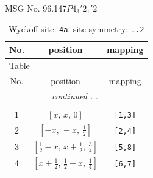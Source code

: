 \documentclass[fleqn,8pt]{jsarticle}
\begin{document}
\setcounter{MaxMatrixCols}{32}

\renewcommand{\tablename}{Table~}
\renewcommand{\figurename}{Figure~}
\begin{center}
\LARGE
MSG No. 96.147\quad$P4_{3}'2_{1}'2$
\end{center}
\renewcommand{\arraystretch}{1.2}
\begin{longtable}{ccc}
\caption{Wyckoff site: {\tt 4a}, site symmetry: {\tt ..2}}
 \\
 \hline \hline
No. & position & mapping \\ \hline \endfirsthead

\multicolumn{2}{l}{\tablename\ \thetable{}} \\
 \hline \hline
No. & position & mapping \\ \hline \endhead

 \hline \hline
\multicolumn{2}{r}{\footnotesize\it continued ...} \\ \endfoot

 \hline \hline
\multicolumn{2}{r}{} \\ \endlastfoot

1 & $\left[ x,\, x,\, 0 \right]$ & {\tt [1,3]} \\ \hline
2 & $\left[ - x,\, - x,\, \frac{1}{2} \right]$ & {\tt [2,4]} \\ \hline
3 & $\left[ \frac{1}{2} - x,\, x + \frac{1}{2},\, \frac{3}{4} \right]$ & {\tt [5,8]} \\ \hline
4 & $\left[ x + \frac{1}{2},\, \frac{1}{2} - x,\, \frac{1}{4} \right]$ & {\tt [6,7]} \\
\end{longtable}
\renewcommand{\arraystretch}{1.2}
\end{document}

